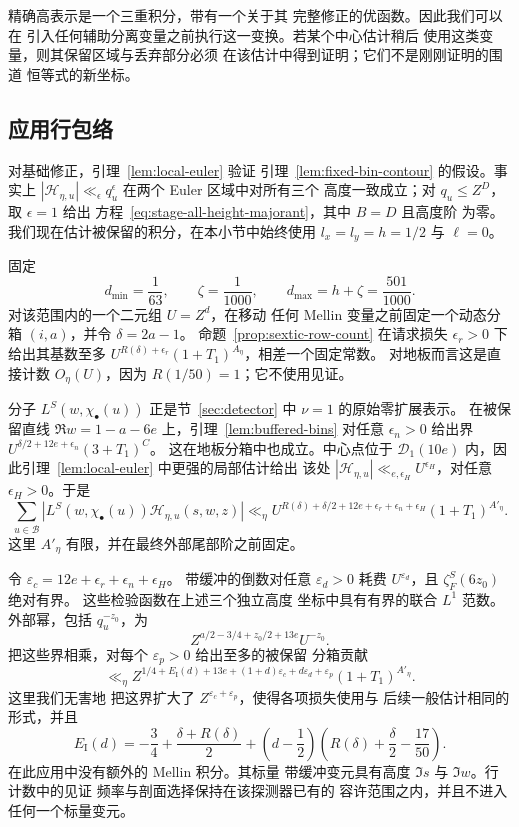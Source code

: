 \documentclass[11pt,a4paper]{article}
\numberwithin{equation}{section}
\numberwithin{figure}{section}
\theoremstyle{definition}
\theoremstyle{remark}
\begin{document}
精确高表示是一个三重积分，带有一个关于其
完整修正的优函数。因此我们可以在
引入任何辅助分离变量之前执行这一变换。若某个中心估计稍后
使用这类变量，则其保留区域与丢弃部分必须
在该估计中得到证明；它们不是刚刚证明的围道
恒等式的新坐标。

\subsection{应用行包络}

对基础修正，引理~\ref{lem:local-euler} 验证
引理~\ref{lem:fixed-bin-contour} 的假设。事实上
$|\mathcal H_{\eta,u}|\ll_\epsilon q_u^\epsilon$ 在两个 Euler 区域中对所有三个
高度一致成立；对 $q_u\le Z^D$，取 $\epsilon=1$ 给出
方程~\eqref{eq:stage-all-height-majorant}，其中 $B=D$ 且高度阶
为零。我们现在估计被保留的积分，在本小节中始终使用
$l_x=l_y=h=1/2$ 与 $\ell=0$。

固定
\[
 d_{\min}=\frac1{63},\qquad \zeta=\frac1{1000},\qquad
 d_{\max}=h+\zeta=\frac{501}{1000}.
\]
对该范围内的一个二元组 $U=Z^d$，在移动
任何 Mellin 变量之前固定一个动态分箱 $(i,a)$，并令 $\delta=2a-1$。
命题~\ref{prop:sextic-row-count} 在请求损失
$\epsilon_r>0$ 下给出其基数至多
$U^{R(\delta)+\epsilon_r}(1+T_1)^{A_\eta}$，相差一个固定常数。
对地板而言这是直接计数 $O_\eta(U)$，因为
$R(1/50)=1$；它不使用见证。

分子 $L^S(w,\chi_\bullet(u))$ 正是节~\ref{sec:detector} 中
$\nu=1$ 的原始零扩展表示。
在被保留直线 $\Re w=1-a-6e$ 上，引理~\ref{lem:buffered-bins} 对任意
$\epsilon_n>0$ 给出界
$U^{\delta/2+12e+\epsilon_n}(3+T_1)^C$。
这在地板分箱中也成立。中心点位于
$\mathcal D_1(10e)$ 内，因此引理~\ref{lem:local-euler} 中更强的局部估计给出
该处 $|\mathcal H_{\eta,u}|\ll_{e,\epsilon_H}U^{\epsilon_H}$，对任意
$\epsilon_H>0$。于是
\[
 \sum_{u\in\mathcal B}
 |L^S(w,\chi_\bullet(u))\mathcal H_{\eta,u}(s,w,z)|
 \ll_\eta
 U^{R(\delta)+\delta/2+12e+\epsilon_r+\epsilon_n+\epsilon_H}
 (1+T_1)^{A'_\eta}.
\]
这里 $A'_\eta$ 有限，并在最终外部尾部阶之前固定。

令 $\varepsilon_c=12e+\epsilon_r+\epsilon_n+\epsilon_H$。
带缓冲的倒数对任意
$\varepsilon_d>0$ 耗费 $U^{\varepsilon_d}$，且 $\zeta_F^S(6z_0)$ 绝对有界。
这些检验函数在上述三个独立高度
坐标中具有有界的联合 $L^1$ 范数。外部幂，包括 $q_u^{-z_0}$，为
\[
 Z^{a/2-3/4+z_0/2+13e}U^{-z_0}.
\]
把这些界相乘，对每个 $\varepsilon_p>0$ 给出至多的被保留
分箱贡献
\begin{equation}
 \ll_\eta Z^{1/4+E_{\mathrm I}(d)+13e
       +(1+d)\varepsilon_c+d\varepsilon_d+\varepsilon_p}
 (1+T_1)^{A'_\eta}.
 \label{eq:balanced-central-contribution}
\end{equation}
这里我们无害地
把这界扩大了 $Z^{\varepsilon_c+\varepsilon_p}$，使得各项损失使用与
后续一般估计相同的形式，并且
\[
 E_{\mathrm I}(d)=-\frac34+\frac{\delta+R(\delta)}2
 +\left(d-\frac12\right)
       \left(R(\delta)+\frac\delta2-\frac{17}{50}\right).
\]
在此应用中没有额外的 Mellin 积分。其标量
带缓冲变元具有高度 $\Im s$ 与 $\Im w$。行计数中的见证
频率与剖面选择保持在该探测器已有的
容许范围之内，并且不进入任何一个标量变元。
\end{document}

